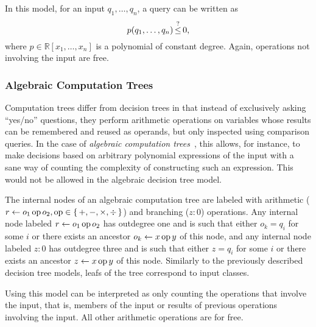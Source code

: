 In this model, for an input \(q_1,\ldots,q_n\), a query can be written as
\begin{displaymath}
	p(q_1, \ldots, q_n) \mathop{\le}^{?} 0,
\end{displaymath}
where \(p \in \mathbb{R}[x_1,\ldots, x_n]\) is a polynomial of constant
degree. Again, operations not involving the input are free.

\subsubsection{Algebraic Computation Trees}
Computation trees differ from decision trees in that instead of exclusively
asking
``yes/no'' questions, they perform arithmetic operations on variables whose
results can be remembered and reused as operands, but only inspected using
comparison queries.
In the case of \emph{algebraic computation trees}~\cite{Be83},
this allows, for instance, to make decisions based on
arbitrary polynomial expressions of the input with a sane way of counting the
complexity of constructing such an expression. This would not be allowed in
the algebraic decision tree model.

The internal nodes of an algebraic computation tree are labeled with
arithmetic (\(r \gets o_1 \operatorname{op} o_2, \operatorname{op} \in \{\,+,-,\times,\div\,\}\)) and
branching (\(z : 0\)) operations. Any internal node labeled \(r \gets o_1 \operatorname{op}
o_2\) has outdegree one and is
such that either \(o_k = q_i\) for some \(i\) or there exists an ancestor \(o_k
\gets x \operatorname{op} y\) of this node, and any internal node labeled \(z : 0\) has
outdegree three and is such that either \(z = q_i\) for some \(i\) or there
exists an ancestor \(z \gets x \operatorname{op} y\) of this node.
Similarly to the previously described decision tree models, leafs of the tree
correspond to input classes.

Using this model can be interpreted as only counting the operations that
involve the input, that is, members of the input or results of previous
operations involving the input. All other arithmetic operations are for free.

